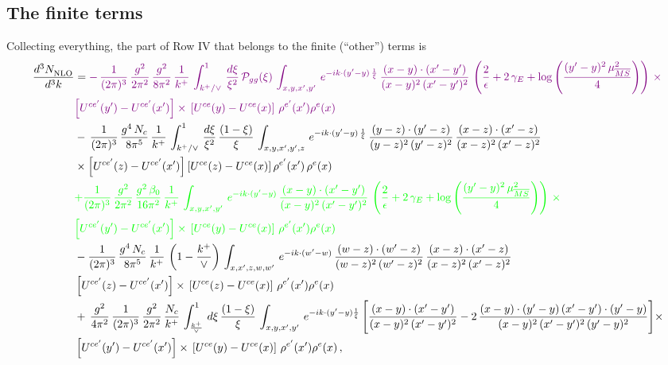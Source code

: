 \documentclass[9pt]{article}
\numberwithin{equation}{section}
\begin{document}
\subsection{The finite terms}
Collecting everything, the part of Row IV that belongs to the finite (``other'') terms is
\begin{align}\label{eq:R4finite}
    \frac{d^{3}N_{\rm NLO}^{\rm}}{d^{3}k}  & =
   {\color{violet} -\,\frac{1}{(2\pi)^{3}}\,\frac{g^{2}}{2\pi^{2}}\,\frac{g^{2}}{8\pi^{2}}\,\frac{1}{k^{+}}\,\int_{k^{+}/\vee}^{1}\, \frac{d\xi}{\xi^{2}}\,\mathcal{P}_{gg}(\xi)\,\int_{x,y,x',y'}\, e^{-ik\cdot (y'-y)\,\frac{1}{\xi}}\, \frac{(x-y)\cdot (x'-y')}{(x-y)^{2}\,(x'-y')^{2}}\,\left(\frac{2}{\epsilon}+2\,\gamma_{E}+\log{\left(\frac{(y'-y)^{2}\,\mu^{2}_{\overline{MS}}}{4}\right)}\right)\,\times}\notag \\ &  {\color{violet}\left[U^{ce'}(y') - U^{ce'}(x')\right] \times\, \left[U^{ce}(y) - U^{ce}(x)\right]\, \rho^{e'}(x') \rho^{e}(x)}
    \notag \\ & -\,\frac{1}{(2\pi)^{3}}\,\frac{g^{4}\,N_{c}}{8\pi^{5}}\, \frac{1}{k^{+}}\,\int_{k^{+}/\vee}^{1}\,\frac{d\xi}{\xi^{2}}\,\frac{(1-\xi)}{\xi}\,\int_{x,y,x',y',z}\, e^{-ik\cdot (y'-y)\,\frac{1}{\xi}}\,\frac{(y-z)\cdot (y'-z)}{(y-z)^{2}\,(y'-z)^{2}}\,\frac{(x-z)\cdot (x'-z)}{(x-z)^{2}\,(x'-z)^{2}}\notag\\
&\times\left[U^{ce'}(z) - U^{ce'}(x')\right]\left[U^{ce}(z) - U^{ce}(x)\right]\rho^{e'}(x')\,\rho^{e}(x) \notag \\ & {\color{green}+\frac{1}{(2\pi)^{3}}\, \frac{g^{2}}{2\pi^{2}}\,\frac{g^{2}\,\beta_{0}}{16\pi^{2}}\, \frac{1}{k^{+}}\,\int_{x,y,x',y'}\, e^{-ik\cdot (y'-y)}\, \frac{(x-y)\cdot (x'-y')}{(x-y)^{2}\,(x'-y')^{2}}\,\left(\frac{2}{\epsilon}+2\,\gamma_{E}+\log{\left(\frac{(y'-y)^{2}\,\mu^{2}_{\overline{MS}}}{4}\right)}\right)\,\times}\notag \\ &  {\color{green}\left[U^{ce'}(y') - U^{ce'}(x')\right] \times\, \left[U^{ce}(y) - U^{ce}(x)\right]\, \rho^{e'}(x') \rho^{e}(x)}\notag \\ &
    -\frac{1}{(2\pi)^{3}}\,\frac{g^{4}\,N_{c}}{8\pi^{5}}\,\frac{1}{k^{+}}\,\left(1-\frac{k^{+}}{\vee}\right)\,\int_{x,x',z,w,w'}\,e^{-ik\cdot (w'-w)}\,\frac{(w-z)\cdot(w'-z)}{(w-z)^{2}\,(w'-z)^{2}}\,\frac{(x-z)\cdot(x'-z)}{(x-z)^{2}\,(x'-z)^{2}}\notag \\
& \left[U^{ce'}(z) - U^{ce'}(x')\right] \times\, \left[U^{ce}(z) - U^{ce}(x)\right]\, \rho^{e'}(x') \rho^{e}(x) \notag \\
&  +\,\frac{g^{2}}{4\pi^{2}}\, \frac{1}{(2\pi)^{3}}\,\frac{g^{2}}{2\pi^{2}}\, \frac{N_{c}}{k^{+}}\,\int_{\frac{k^{+}}{\vee}}^{1}\,d\xi\, \frac{(1-\xi)}{\xi}\, \int_{x,y,x',y'}\,e^{-ik\cdot (y'-y)\frac{1}{\xi}}\,\Bigg[\frac{(x-y)\cdot (x'-y')}{(x-y)^{2}\, (x'-y')^{2}} -2\,\frac{(x-y)\cdot (y'-y)\, (x'-y')\cdot (y'-y)}{(x-y)^{2}\,(x'-y')^{2}\,(y'-y)^{2}}\Bigg]\times\notag \\ &  \left[U^{ce'}(y') - U^{ce'}(x')\right] \times\, \left[U^{ce}(y) - U^{ce}(x)\right]\, \rho^{e'}(x') \rho^{e}(x)\,,
\end{align}
\end{document}
